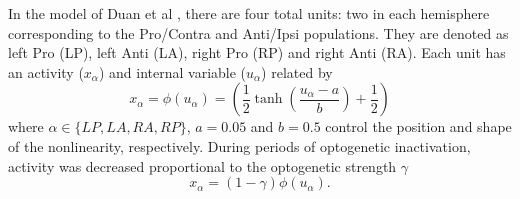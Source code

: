 \documentclass[11pt]{article}
\begin{document}
%
%

In the model of Duan et al \cite{duan2018collicular}, there are four total units: two in each hemisphere corresponding to the Pro/Contra and Anti/Ipsi populations.  
They are denoted as left Pro (LP), left Anti (LA), right Pro (RP) and right Anti (RA).  
Each unit has an activity ($x_\alpha$) and internal variable ($u_\alpha$) related by
\begin{equation}
x_\alpha = \phi(u_\alpha) = \left(\frac{1}{2}\tanh\left(\frac{u_\alpha - a}{b}\right)+ \frac{1}{2} \right)
\end{equation}
where $\alpha \in \{LP, LA, RA, RP\}$, $a = 0.05$ and $b = 0.5$ control the position and shape of the nonlinearity, respectively.
During periods of optogenetic inactivation, activity was decreased proportional to the optogenetic strength $\gamma$
\begin{equation}
x_\alpha = (1-\gamma)\phi(u_\alpha).
\end{equation}
\end{document}
